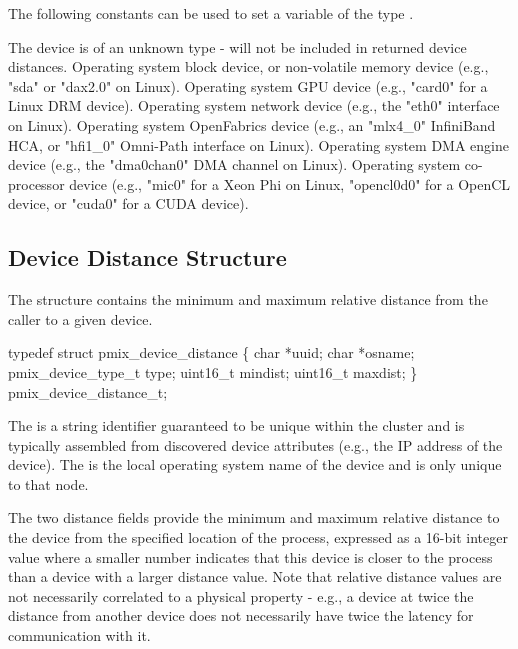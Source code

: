 The following constants can be used to set a variable of the type .

\begin{constantdesc}
%
The device is of an unknown type - will not be included in returned device distances.
%
Operating system block device, or non-volatile memory device (e.g., "sda" or "dax2.0" on Linux).
%
Operating system \ac{GPU} device (e.g., "card0" for a Linux \ac{DRM} device).
%
Operating system network device (e.g., the "eth0" interface on Linux).
%
Operating system OpenFabrics device (e.g., an "mlx4_0" InfiniBand \ac{HCA}, or "hfi1_0" Omni-Path interface on Linux).
%
Operating system \ac{DMA} engine device (e.g., the "dma0chan0" \ac{DMA} channel on Linux).
%
Operating system co-processor device (e.g., "mic0" for a Xeon Phi on Linux, "opencl0d0" for a OpenCL device, or "cuda0" for a \ac{CUDA} device).
%
\end{constantdesc}

\subsection{Device Distance Structure}

The  structure contains the minimum and maximum relative distance from the caller to a given device.

\cspecificstart
\begin{codepar}
typedef struct pmix_device_distance \{
    char *uuid;
    char *osname;
    pmix_device_type_t type;
    uint16_t mindist;
    uint16_t maxdist;
\} pmix_device_distance_t;
\end{codepar}
\cspecificend

The  is a string identifier guaranteed to be unique within the cluster and is typically assembled from discovered device attributes (e.g., the \ac{IP} address of the device). The  is the local operating system name of the device and is only unique to that node.

The two distance fields provide the minimum and maximum relative distance to the device from the specified location of the process, expressed as a 16-bit integer value where a smaller number indicates that this device is closer to the process than a device with a larger distance value. Note that relative distance values are not necessarily correlated to a physical property - e.g., a device at twice the distance from another device does not necessarily have twice the latency for communication with it.

